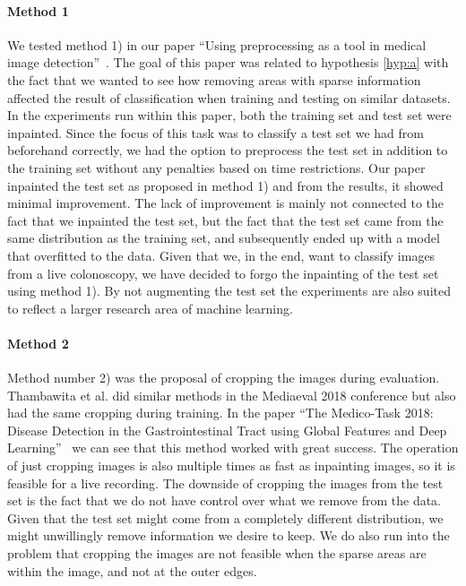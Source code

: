 \paragraph{Method 1}
We tested method 1) in our paper ``Using preprocessing as a tool in medical image detection''~\cite{26254}.
The goal of this paper was related to hypothesis \ref{hyp:a} with the fact that we wanted to see how removing areas with sparse information affected the result of classification when training and testing on similar datasets. 
In the experiments run within this paper, both the training set and test set were inpainted. 
Since the focus of this task was to classify a test set we had from beforehand correctly, we had the option to preprocess the test set in addition to the training set without any penalties based on time restrictions. 
Our paper inpainted the test set as proposed in method 1) and from the results, it showed minimal improvement. The lack of improvement is mainly not connected to the fact that we inpainted the test set, but the fact that the test set came from the same distribution as the training set, and subsequently ended up with a model that overfitted to the data.
Given that we, in the end, want to classify images from a live colonoscopy, we have decided to forgo the inpainting of the test set using method 1).
By not augmenting the test set the experiments are also suited to reflect a larger research area of machine learning.



\paragraph{Method 2}
Method number 2) was the proposal of cropping the images during evaluation.  Thambawita et al. did similar methods in the Mediaeval 2018 conference but also had the same cropping during training. In the paper ``The Medico-Task 2018: Disease Detection in the Gastrointestinal Tract using Global Features and Deep Learning''~\cite{26205} we can see that this method worked with great success. 
The operation of just cropping images is also multiple times as fast as inpainting images, so it is feasible for a live recording.  
The downside of cropping the images from the test set is the fact that we do not have control over what we remove from the data. Given that the test set might come from a completely different distribution, we might unwillingly remove information we desire to keep. We do also run into the problem that cropping the images are not feasible when the sparse areas are within the image, and not at the outer edges.

